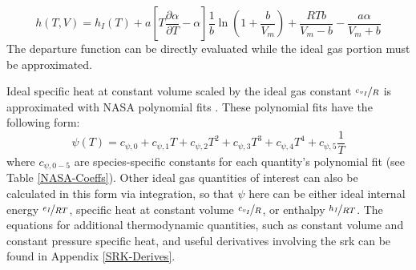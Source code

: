 \begin{equation} \label{thermo_enthalpy}
h(T,V) = h_I(T) +  a \left[ T \dfrac{\partial \alpha}{\partial T} - \alpha \right] \dfrac{1}{b}\ln\left( 1 + \dfrac{b}{V_m} \right) + \dfrac{RTb}{V_m - b} - \dfrac{a \alpha}{V_m + b}
\end{equation}
The departure function can be directly evaluated while the ideal gas portion must be approximated.

Ideal specific heat at constant volume scaled by the ideal gas constant $\nicefrac{c_{v_I}}{R}$ is approximated with NASA polynomial fits \cite{NASAPoly}. These polynomial fits have the following form:
\begin{equation} \label{NASA_poly}
\psi(T) = c_{\psi, 0} + c_{\psi, 1}T + c_{\psi, 2}T^2 + c_{\psi, 3}T^3 + c_{\psi, 4}T^4  + c_{\psi, 5}\dfrac{1}{T}
\end{equation}
where $c_{\psi,0-5}$ are species-specific constants for each quantity's polynomial fit (see Table \ref{NASA-Coeffs}). Other ideal gas quantities of interest can also be calculated in this form via integration, so that $\psi$ here can be either ideal internal energy $\nicefrac{e_I}{RT}$, specific heat at constant volume $\nicefrac{c_{v_I}}{R}$, or enthalpy $\nicefrac{h_I}{RT}$. 
The equations for additional thermodynamic quantities, such as constant volume and constant pressure specific heat, and useful derivatives involving the \gls{srk} can be found in Appendix \ref{SRK-Derives}. 


